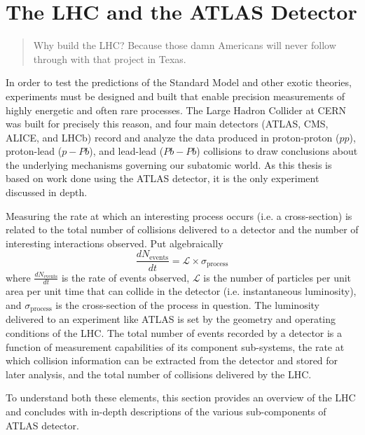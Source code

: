 \chapter{The LHC and the ATLAS Detector}
\label{sec:atlasAndLHC}
\begin{quote}
Why build the LHC? Because those damn Americans will never follow through with that project in Texas. \\ 
\end{quote}

In order to test the predictions of the Standard Model and other exotic theories, experiments must be designed and built that enable precision measurements of highly energetic and often rare processes. The Large Hadron Collider at CERN was built for precisely this reason, and four main detectors (ATLAS, CMS, ALICE, and LHCb) record and analyze the data produced in proton-proton ($pp$), proton-lead ($p-Pb$), and lead-lead ($Pb-Pb$) collisions to draw conclusions about the underlying mechanisms governing our subatomic world. As this thesis is based on work done using the ATLAS detector, it is the only experiment discussed in depth.

Measuring the rate at which an interesting process occurs (i.e. a cross-section) is related to the total number of collisions delivered to a detector and the number of interesting interactions observed. Put algebraically
\begin{equation}
\label{eq:lumi_xsec}
  \frac{dN_{\text{events}}}{dt} = \mathcal{L} \times \sigma_{\text{process}}
\end{equation}
where $\frac{dN_{\text{events}}}{dt}$ is the rate of events observed, $\mathcal{L}$ is the number of particles per unit area per unit time that can collide in the detector (i.e. instantaneous luminosity), and $\sigma_{\text{process}}$ is the cross-section of the process in question. The luminosity delivered to an experiment like ATLAS is set by the geometry and operating conditions of the LHC. The total number of events recorded by a detector is a function of measurement capabilities of its component sub-systems, the rate at which collision information can be extracted from the detector and stored for later analysis, and the total number of collisions delivered by the LHC. 

To understand both these elements, this section provides an overview of the LHC and concludes with in-depth descriptions of the various sub-components of ATLAS detector.

